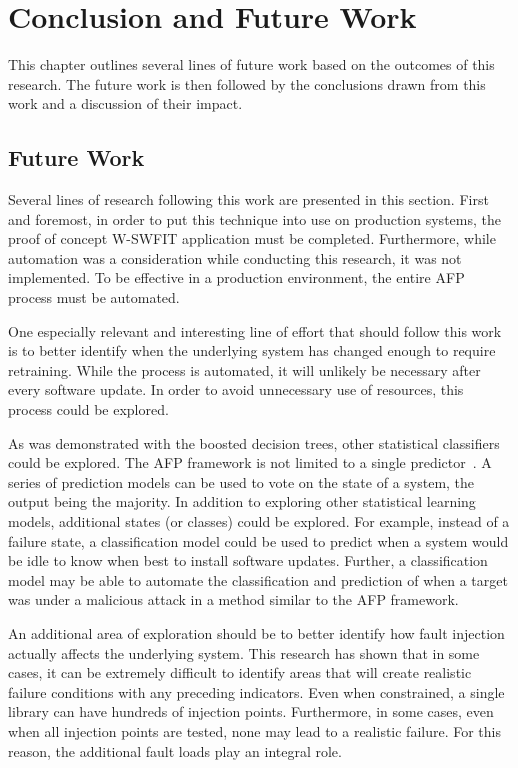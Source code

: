 \section{Conclusion and Future Work} \label{chapter5}
This chapter outlines several lines of future work based on the outcomes of
this research.  The future work is then followed by the conclusions drawn from
this work and a discussion of their impact.

\subsection{Future Work}
Several lines of research following this work are presented in this section.
First and foremost, in order to put this technique into use on production
systems, the proof of concept \ac{W-SWFIT} application must be completed.
Furthermore, while automation was a consideration while conducting this
research, it was not implemented.  To be effective in a production environment,
the entire \ac{AFP} process must be automated.

One especially relevant and interesting line of effort that should follow this
work is to better identify when the underlying system has changed enough to
require retraining.  While the process is automated, it will unlikely be
necessary after every software update.  In order to avoid unnecessary use of
resources, this process could be explored.

As was demonstrated with the boosted decision trees, other statistical
classifiers could be explored.  The \ac{AFP} framework is not limited to a
single predictor~\cite{irrera2015}.  A series of prediction models can be used
to vote on the state of a system, the output being the majority.  In addition
to exploring other statistical learning models, additional states (or classes)
could be explored.  For example, instead of a failure state, a classification
model could be used to predict when a system would be idle to know when best to
install software updates.  Further, a classification model may be able to
automate the classification and prediction of when a target was under a
malicious attack in a method similar to the \ac{AFP} framework.

An additional area of exploration should be to better identify how fault
injection actually affects the underlying system.  This research has shown that
in some cases, it can be extremely difficult to identify areas that will create
realistic failure conditions with any preceding indicators.  Even when
constrained, a single library can have hundreds of injection points.
Furthermore, in some cases, even when all injection points are tested, none may
lead to a realistic failure.  For this reason, the additional fault loads play
an integral role.

